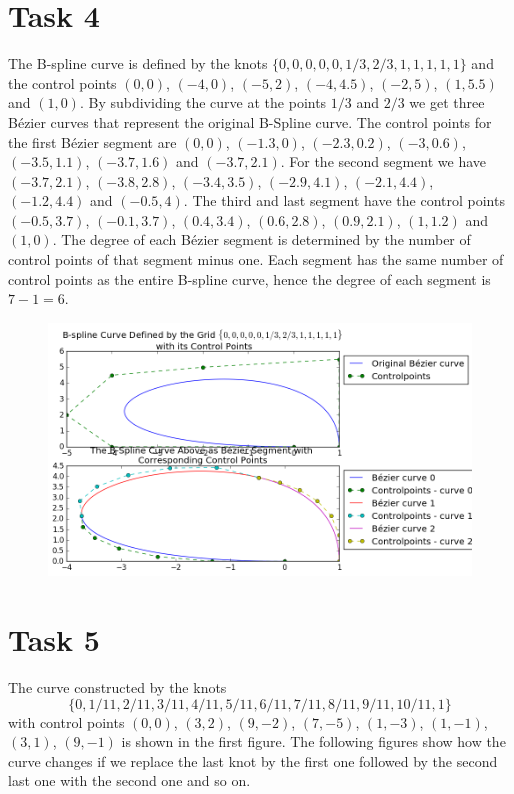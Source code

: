 \documentclass[]{article}
\begin{document}
\section*{Task 4}
The B-spline curve is defined by the knots $\{0,0,0,0,0,1/3,2/3,1,1,1,1,1\}$ and the control points $(0,0)$, $(-4,0)$, $(-5,2)$, $(-4,4.5)$, $(-2,5)$, $(1,5.5)$ and $(1,0)$. By subdividing the curve at the points $1/3$ and $2/3$ we get three B\'{e}zier curves that represent the original B-Spline curve. The control points for the first B\'{e}zier segment are $(0,0)$, $(-1.3,0)$, $(-2.3,0.2)$, $(-3,0.6)$, $(-3.5,1.1)$, $(-3.7,1.6)$ and $(-3.7,2.1)$. For the second segment we have $(-3.7,2.1)$, $(-3.8,2.8)$, $(-3.4,3.5)$, $(-2.9,4.1)$, $(-2.1,4.4)$, $(-1.2,4.4)$ and $(-0.5,4)$. The third and last segment have the control points $(-0.5,3.7)$, $(-0.1,3.7)$, $(0.4,3.4)$, $(0.6,2.8)$, $(0.9,2.1)$, $(1,1.2)$ and $(1,0)$. The degree of each B\'{e}zier segment is determined by the number of control points of that segment minus one. Each segment has the same number of control points as the entire B-spline curve, hence the degree of each segment is $7-1=6$.

\begin{figure}[h!]
	\includegraphics[scale=0.5]{task4}
\end{figure}

\section*{Task 5}
The curve constructed by the knots $$\{0,1/11,2/11,3/11,4/11,5/11,6/11,7/11,8/11,9/11,10/11,1\}$$ with control points $(0,0)$, $(3,2)$, $(9,-2)$, $(7,-5)$, $(1,-3)$, $(1,-1)$, $(3,1)$, $(9,-1)$ is shown in the first figure. The following figures show how the curve changes if we replace the last knot by the first one followed by the second last one with the second one and so on. 
\end{document}
